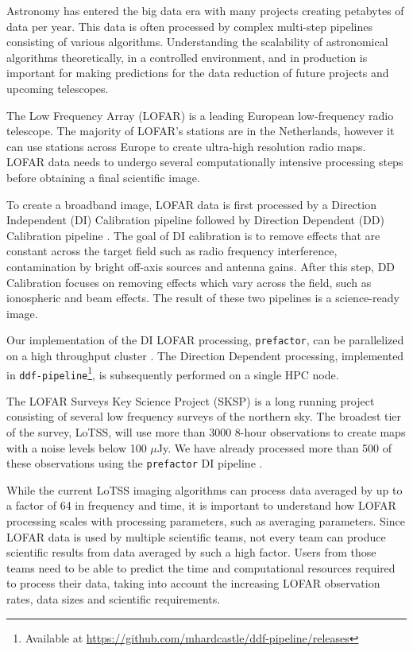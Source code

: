
Astronomy has entered the big data era with many projects creating petabytes of data per year. This data is often processed by complex multi-step pipelines consisting of various algorithms. Understanding the scalability of astronomical algorithms theoretically, in a controlled environment, and in production is important for making predictions for the data reduction of future projects and upcoming telescopes. 

The Low Frequency Array (LOFAR) \citep{LOFAR} is a leading European low-frequency radio telescope. The majority of LOFAR's stations are in the Netherlands, however it can use stations across Europe to create ultra-high resolution radio maps. LOFAR data needs to undergo several computationally intensive processing steps before obtaining a final scientific image. 

To create a broadband image, LOFAR data is first processed by a Direction Independent (DI) Calibration pipeline followed by Direction Dependent (DD) Calibration pipeline \citep[e.g.][]{lofar_prefactor, Wendy_bootes,tassesmirnov, tasse2018faceting}. The goal of DI calibration is to remove effects that are constant across the target field such as radio frequency interference, contamination by bright off-axis sources and antenna gains. After this step, DD Calibration focuses on removing effects which vary across the field, such as ionospheric and beam effects. The result of these two pipelines is a science-ready image. 

Our implementation of the DI LOFAR processing, \texttt{prefactor}, can be parallelized on a high throughput cluster \citep{mechev17}. The Direction Dependent processing, implemented in \texttt{ddf-pipeline}\footnote{Available at \href{https://github.com/mhardcastle/ddf-pipeline/releases}{https://github.com/mhardcastle/ddf-pipeline/releases}}, is subsequently performed on a single HPC node. 

The LOFAR Surveys Key Science Project (SKSP) \citep{lotss, LOTSS_DR2} is a long running project consisting of several low frequency surveys of the northern sky. The broadest tier of the survey, LoTSS, will use more than 3000 8-hour observations to create maps with a noise levels below 100 $\mu$Jy. We have already processed more than 500 of these observations using the \texttt{prefactor} DI pipeline \citep{lofar_prefactor, prefactor_zenodo}. 

While the current LoTSS imaging algorithms can process data averaged by up to a factor of 64 in frequency and time, it is important to understand how LOFAR processing scales with processing parameters, such as averaging parameters. Since LOFAR data is used by multiple scientific teams, not every team can produce scientific results from data averaged by such a high factor. Users from those teams need to be able to predict the time and computational resources required to process their data, taking into account the increasing LOFAR observation rates, data sizes and scientific requirements. 

